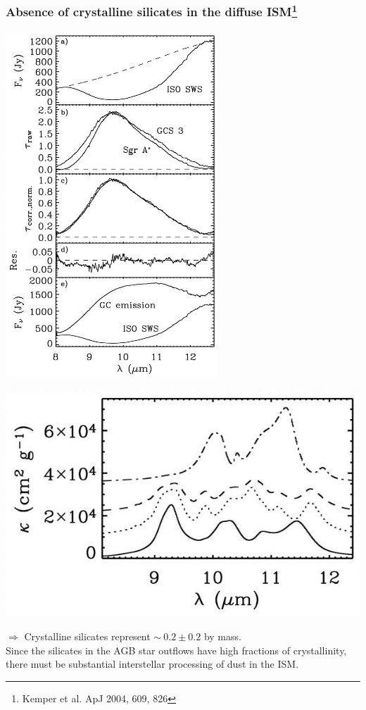 \begin{frame}\frametitle{Absence of crystalline silicates in the diffuse ISM\footnote{Kemper et al. ApJ 2004, 609, 826}}

\begin{minipage}[t]{0.5\textwidth}
\vspace{0.5cm}
  \begin{center}
      \includegraphics[width=0.6\textwidth,height=!]{./D/taus_ISO_GC.jpg}
      \end{center}
\end{minipage}
\hfill
\begin{minipage}[t]{0.49\textwidth}
\vspace{-0.5cm}
  \begin{center}
\includegraphics[width=\textwidth,height=!]{./D/crist_ks.jpg}
    \end{center}
$\Rightarrow$ Crystalline silicates represent $\sim~0.2\pm0.2$ by
mass. \\
Since the silicates in the AGB star outflows have high
fractions of crystallinity, there must be substantial interstellar
processing of dust in the ISM.
\end{minipage}


\end{frame}
